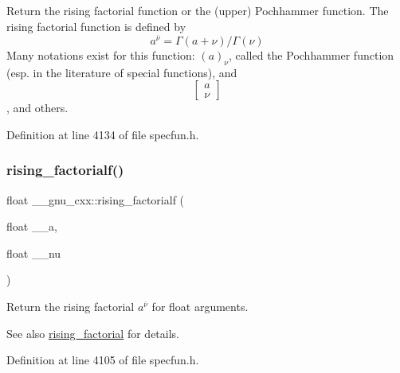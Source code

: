 Return the rising factorial function or the (upper) Pochhammer function. The rising factorial function is defined by \[ a^{\overline{\nu}} = \Gamma(a + \nu) / \Gamma(\nu) \] Many notations exist for this function\+: $ (a)_\nu $, called the Pochhammer function (esp. in the literature of special functions), and \[ \left[ \begin{array}{c} a \\ \nu \end{array} \right] \], and others. 



Definition at line 4134 of file specfun.\+h.

\mbox{\label{group__gnu__math__spec__func_ga10da05b995a42f0b0625e61186af7449}} 
\subsubsection{\texorpdfstring{rising\+\_\+factorialf()}{rising\_factorialf()}}
{\footnotesize\ttfamily float \+\_\+\+\_\+gnu\+\_\+cxx\+::rising\+\_\+factorialf (\begin{DoxyParamCaption}\item[{float}]{\+\_\+\+\_\+a,  }\item[{float}]{\+\_\+\+\_\+nu }\end{DoxyParamCaption})\hspace{0.3cm}{\ttfamily [inline]}}

Return the rising factorial $ a^{\overline{\nu}} $ for float arguments.

\begin{DoxySeeAlso}{See also}
\hyperlink{group__gnu__math__spec__func_gae8c36a0e1f60254cf212a3806f7c675c}{rising\+\_\+factorial} for details. 
\end{DoxySeeAlso}


Definition at line 4105 of file specfun.\+h.

\mbox{\label{group__gnu__math__spec__func_gac9a399ae01c315aa78a64b445795d974}} 
